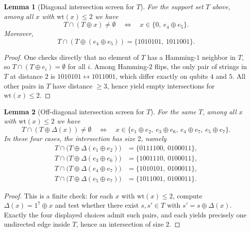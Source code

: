 \documentclass[11pt]{article}
\newtheorem{lemma}{Lemma}
\begin{document}
\begin{lemma}[Diagonal intersection screen for $T$]
\label{lem:diag-screen}
For the support set $T$ above, among all $x$ with $\mathrm{wt}(x)\le 2$ we have
\[
T\cap(T\oplus x)\neq\emptyset
\quad\Longleftrightarrow\quad
x\in\{0,\ e_4\oplus e_5\}.
\]
Moreover,
\[
T\cap(T\oplus(e_4\oplus e_5))=\{1010101,\ 1011001\}.
\]
\end{lemma}

\begin{proof}
One checks directly that no element of $T$ has a Hamming-$1$ neighbor in $T$, so $T\cap(T\oplus e_i)=\emptyset$ for all $i$.
Among Hamming-$2$ flips, the only pair of strings in $T$ at distance $2$ is
$1010101\leftrightarrow 1011001$, which differ exactly on qubits $4$ and $5$.
All other pairs in $T$ have distance $\ge 3$, hence yield empty intersections for $\mathrm{wt}(x)\le 2$.
\end{proof}

\begin{lemma}[Off-diagonal intersection screen for $T$]
\label{lem:offdiag-screen}
For the same $T$, among all $x$ with $\mathrm{wt}(x)\le 2$ we have
\[
T\cap(T\oplus\Delta(x))\neq\emptyset
\quad\Longleftrightarrow\quad
x\in\{e_1\oplus e_2,\ e_3\oplus e_6,\ e_4\oplus e_7,\ e_5\oplus e_7\}.
\]
In these four cases, the intersection has size $2$, namely
\[
\begin{aligned}
T\cap\bigl(T\oplus\Delta(e_1\oplus e_2)\bigr)&=\{0111100,\ 0100011\},\\
T\cap\bigl(T\oplus\Delta(e_3\oplus e_6)\bigr)&=\{1001110,\ 0100011\},\\
T\cap\bigl(T\oplus\Delta(e_4\oplus e_7)\bigr)&=\{1010101,\ 0100011\},\\
T\cap\bigl(T\oplus\Delta(e_5\oplus e_7)\bigr)&=\{1011001,\ 0100011\}.
\end{aligned}
\]
\end{lemma}

\begin{proof}
This is a finite check: for each $x$ with $\mathrm{wt}(x)\le 2$, compute $\Delta(x)=1^7\oplus x$ and test whether
there exist $s,s'\in T$ with $s'=s\oplus\Delta(x)$.
Exactly the four displayed choices admit such pairs, and each yields precisely one undirected edge inside $T$,
hence an intersection of size $2$.
\end{proof}
\end{document}

